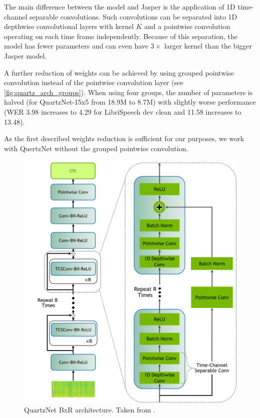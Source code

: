 The main difference between the model and Jasper is the application of 1D time-channel separable convolutions.  Such convolutions can be separated into 1D depthwise convolutional layers with kernel $K$ and a pointwise convolution operating on each time frame independently. Because of this separation, the model has fewer parameters and can even have $3 \times$ larger kernel than the bigger Jasper model.

A further reduction of weights can be achieved by using grouped pointwise convolution instead of the pointwise convolution layer (see  \cref{fig:quartz_arch_groups}). When using four groups, the number of parameters is halved (for QuartzNet-15x5 from 18.9M to 8.7M) with slightly worse performance (WER 3.98 increases to 4.29 for LibriSpeech dev clean and 11.58 increases to 13.48).

As the first described weights reduction is sufficient for our purposes, we work with QuertzNet without the grouped pointwise convolution.

\begin{figure}[h]
	\centering
	\includegraphics[width=\linewidth]{img/QuartzNet_v2.png}
	\caption{QuartzNet BxR architecture. Taken from .}
	\label{fig:quartz_arch}
\end{figure}

